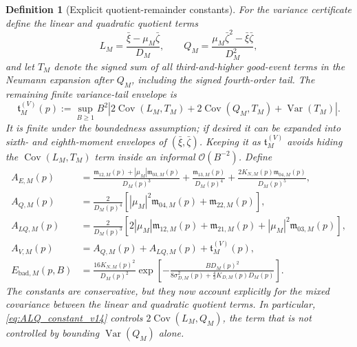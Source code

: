 \documentclass[11pt]{article}
\newtheorem{definition}{Definition}
\newcommand{\Var}{\operatorname{Var}}
\newcommand{\Cov}{\operatorname{Cov}}
\newcommand{\1}{\mathbf{1}}
\newcommand{\OO}{\mathcal{O}}
\newcommand{\abs}[1]{\left\lvert #1 \right\rvert}
\begin{document}
\begin{definition}[Explicit quotient-remainder constants]
For the variance certificate define the linear and quadratic quotient terms
\begin{equation}
    L_M=\frac{\bar\xi-\mu_M\bar\zeta}{D_M},
    \qquad
    Q_M=\frac{\mu_M\bar\zeta^2-\bar\xi\bar\zeta}{D_M^2},
\end{equation}
and let \(T_M\) denote the signed sum of all third-and-higher good-event terms in the Neumann expansion after \(Q_M\), including the signed fourth-order tail.  The remaining finite variance-tail envelope is
\begin{equation}
    \mathfrak t^{(V)}_M(p)
    :=\sup_{B\ge1}B^2
    \abs{2\Cov(L_M,T_M)+2\Cov(Q_M,T_M)+\Var(T_M)}.
    \label{eq:tail_variance_envelope_v14}
\end{equation}
It is finite under the boundedness assumption; if desired it can be expanded into sixth- and eighth-moment envelopes of \((\bar\xi,\bar\zeta)\).  Keeping it as \(\mathfrak t^{(V)}_M\) avoids hiding the \(\Cov(L_M,T_M)\) term inside an informal \(\OO(B^{-2})\).
Define
\begin{align}
    A_{E,M}(p)
    &=\frac{\mathfrak m_{12,M}(p)+\abs{\mu_M}\mathfrak m_{03,M}(p)}{D_M(p)^3}
      +\frac{\mathfrak m_{13,M}(p)}{D_M(p)^4}
      +\frac{2K_{N,M}(p)\mathfrak m_{04,M}(p)}{D_M(p)^5},
       \label{eq:AE_constant_v4}\\
    A_{Q,M}(p)
    &=\frac{2}{D_M(p)^4}\left[
      \abs{\mu_M}^2\mathfrak m_{04,M}(p)+\mathfrak m_{22,M}(p)
      \right],
      \label{eq:AQ_constant_v14}\\
    A_{LQ,M}(p)
    &=\frac{2}{D_M(p)^3}\left[
      2\abs{\mu_M}\mathfrak m_{12,M}(p)+\mathfrak m_{21,M}(p)
      +\abs{\mu_M}^2\mathfrak m_{03,M}(p)
      \right],
      \label{eq:ALQ_constant_v14}\\
    A_{V,M}(p)
    &=A_{Q,M}(p)+A_{LQ,M}(p)+\mathfrak t^{(V)}_M(p),
      \label{eq:AV_constant_v4}\\
    E_{\mathrm{bad},M}(p,B)
    &=\frac{16K_{N,M}(p)^2}{D_M(p)^2}
    \exp\!\left[-\frac{B D_M(p)^2}{8\sigma_{D,M}^2(p)+\frac{4}{3}K_{D,M}(p)D_M(p)}\right].
\end{align}
The constants are conservative, but they now account explicitly for the mixed covariance between the linear and quadratic quotient terms.  In particular, \cref{eq:ALQ_constant_v14} controls \(2\Cov(L_M,Q_M)\), the term that is not controlled by bounding \(\Var(Q_M)\) alone.
\end{definition}
\end{document}
